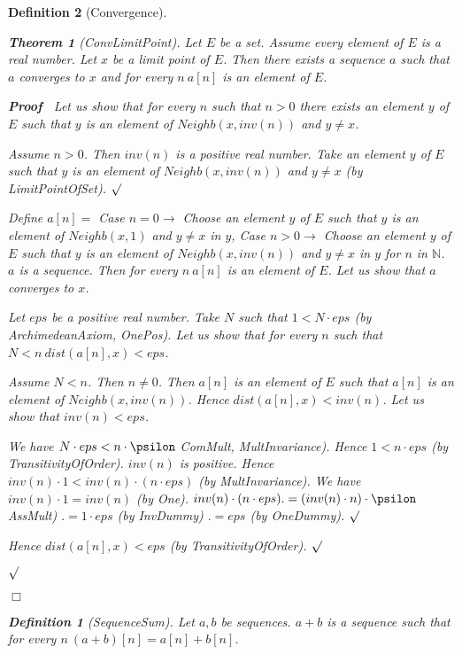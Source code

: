 \documentclass{article}
\newenvironment{forthel}{\begin{leftbar}}{\end{leftbar}}
\newenvironment{proof}{\noindent\textbf{Proof\ }}{\hspace*{\fill}$\Box$\medskip}
\newenvironment{subproof}{\begin{list}{}{}
		\item[\text{Proof}]}{\hfill $\surd$ \end{list}}
\newtheorem{theorem}{Theorem}
\newtheorem{definition}{Definition}
\newcommand{\NN}{\mathbb{N}}
\newcommand{\plusone}{+}
\begin{document}
\begin{forthel}
\begin{definition}[Convergence]
	\begin{theorem}[ConvLimitPoint]
	Let $E$ be a set. Assume every element of $E$ is a real number. Let $x$ be a limit point of $E$.
	Then there exists a sequence $a$ such that $a$ converges to $x$ and for every $n \ a[n]$ is an element of $E$.
	\end{theorem}
	\begin{proof}
	Let us show that for every $n$ such that $n > 0$ there exists an element $y$ of $E$ such that
	$y$ is an element of $Neighb(x,inv(n))$ and $y \neq x$.
	\begin{subproof}
	Assume $n > 0$.
	Then $inv(n)$ is a positive real number.
	Take an element $y$ of $E$ such that $y$ is an element of $Neighb(x,inv(n))$
	and $y \neq x$ (by LimitPointOfSet).
	\end{subproof}
	Define $a[n] =$ Case $n = 0 \rightarrow$ Choose an element $y$ of $E$ such that $y$ is an element of
	$Neighb(x,1)$ and $y \neq x$ in $y$,
	Case $n > 0 \rightarrow$ Choose an element $y$ of $E$ such that $y$ is an element of
	$Neighb(x,inv(n))$ and $y \neq x$ in $y$
	for $n$ in $\NN$.
	$a$ is a sequence.	
	Then for every $n \ a[n]$ is an element of $E$.
	Let us show that $a$ converges to $x$.
	\begin{subproof}
	Let $eps$ be a positive real number.
	Take $N$ such that $1 < N \cdot eps$ (by ArchimedeanAxiom, OnePos).
	Let us show that for every $n$ such that $N < n \ dist(a[n],x) < eps$.
	\begin{subproof}
	Assume $N < n$. Then $n \neq 0$.
	Then $a[n]$ is an element of $E$ such that $a[n]$ is an element of $Neighb(x,inv(n))$.
	Hence $dist(a[n],x) < inv(n)$.
	Let us show that $inv(n) < eps$.
	\begin{subproof}
	We have $N \cdot eps < n \cdot \psilon$ ComMult, MultInvariance).
	Hence $1 < n \cdot eps$ (by TransitivityOfOrder).
	$inv(n)$ is positive.
	Hence $inv(n) \cdot 1 < inv(n) \cdot (n \cdot eps)$ (by MultInvariance).
	We have $inv(n) \cdot 1 = inv(n)$ (by One).
	$inv(n) \cdot (n \cdot eps) .= (inv(n) \cdot n) \cdot \psilon$ AssMult)
	$.= 1 \cdot eps$ (by InvDummy)
	$.= eps$ (by OneDummy).
	\end{subproof}
	Hence $dist(a[n],x) < eps$ (by TransitivityOfOrder).
	\end{subproof}
	\end{subproof}
	\end{proof}
	
	\begin{definition}[SequenceSum]
	Let $a,b$ be sequences. $a \plusone b$ is a sequence such that for every $n \ (a \plusone b)[n] = a[n] + b[n]$.
	\end{definition}
	

\end{definition}
\end{forthel}
\end{document}
